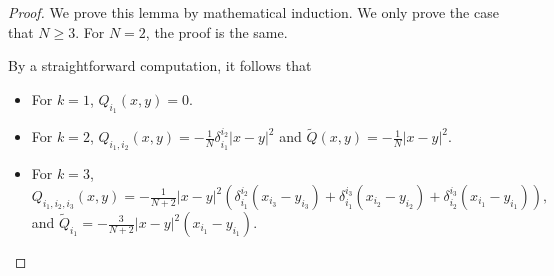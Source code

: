 \documentclass[11pt,reqno]{article}
\numberwithin{equation}{section}
\begin{document}
   \begin{proof}
   We prove this lemma by mathematical induction. We only prove the case that $N\ge3$. For $N=2$, the proof is the same.

By  a straightforward computation, it follows that
   \begin{itemize}
				\item For $k = 1$, $Q_{i_1}(x,y) = 0$.
				
				\item For $k = 2$,  $Q_{i_1,i_2}(x,y) = -\frac{1}{N}\delta_{i_1}^{i_2}|x - y|^2$ and $\widetilde{Q}(x,y)=-\frac{1}{N} |x - y|^2$.
				
				\item For $k = 3$,
					$
					Q_{i_1,i_2,i_3}(x,y) = -\frac{1}{N+2}|x - y|^2\left( \delta_{i_1}^{i_2}(x_{i_3} - y_{i_3}) + \delta_{i_1}^{i_3}(x_{i_2} - y_{i_2}) + \delta_{i_2}^{i_3}(x_{i_1} - y_{i_1}) \right),
					$
                    and 
                    $\widetilde{Q}_{i_1}=-\frac{3}{N+2}|x - y|^2(x_{i_1} - y_{i_1}) $.
                    \end{itemize}
                

\end{proof}
\end{document}
